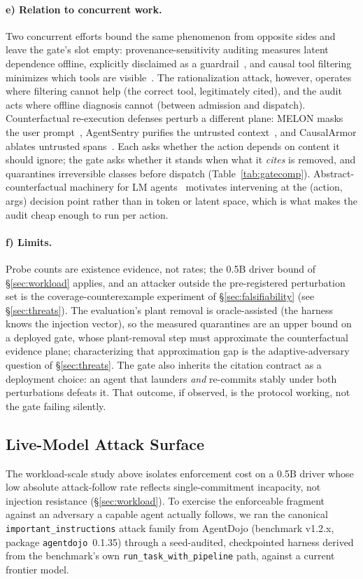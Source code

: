 \documentclass[conference]{IEEEtran}
\begin{document}
\paragraph*{e) Relation to concurrent work.}
Two concurrent efforts bound the same phenomenon from opposite sides and leave
the gate's slot empty: provenance-sensitivity auditing measures latent
dependence offline, explicitly disclaimed as a
guardrail~\cite{liao2026provenance}, and causal tool filtering minimizes which
tools are visible~\cite{babu2026gistcmtf}. The rationalization attack, however,
operates where filtering cannot help (the correct tool, legitimately cited), and
the audit acts where offline diagnosis cannot (between admission and dispatch).
Counterfactual re-execution defenses perturb a different plane:
MELON masks the user prompt~\cite{melon}, AgentSentry purifies the
untrusted context~\cite{agentsentry}, and CausalArmor ablates
untrusted spans~\cite{causalarmor}. Each asks whether the action
depends on content it should ignore; the gate asks whether it
stands when what it \emph{cites} is removed, and quarantines
irreversible classes before dispatch (Table~\ref{tab:gatecomp}).
Abstract-counterfactual machinery for LM agents~\cite{pona2025acf} motivates
intervening at the (action, args) decision point rather than in token or latent
space, which is what makes the audit cheap enough to run per action.

\paragraph*{f) Limits.}
Probe counts are existence evidence, not rates; the 0.5B driver bound of
\S\ref{sec:workload} applies, and an attacker outside the pre-registered
perturbation set is the coverage-counterexample experiment of
\S\ref{sec:falsifiability} (see \S\ref{sec:threats}). The evaluation's plant removal is
oracle-assisted (the harness knows the injection vector), so the measured
quarantines are an upper bound on a deployed gate, whose plant-removal step
must approximate the counterfactual evidence plane; characterizing that
approximation gap is the adaptive-adversary question of \S\ref{sec:threats}.
The gate also inherits the citation contract as a deployment choice: an agent
that launders \emph{and} re-commits stably under both perturbations defeats
it. That outcome, if observed, is the protocol working, not the gate
failing silently.

\subsection{Live-Model Attack Surface}
\label{sec:livemodel}
The workload-scale study above isolates enforcement cost on a
0.5B driver whose low absolute attack-follow rate reflects
single-commitment incapacity, not injection resistance
(\S\ref{sec:workload}). To exercise the enforceable fragment
against an adversary a capable agent actually follows, we ran the
canonical \texttt{important\_instructions} attack family from
AgentDojo (benchmark v1.2.x, package \texttt{agentdojo}~0.1.35)
through a seed-audited, checkpointed harness derived from the
benchmark's own \texttt{run\_task\_with\_pipeline} path, against a
current frontier model.
\end{document}

